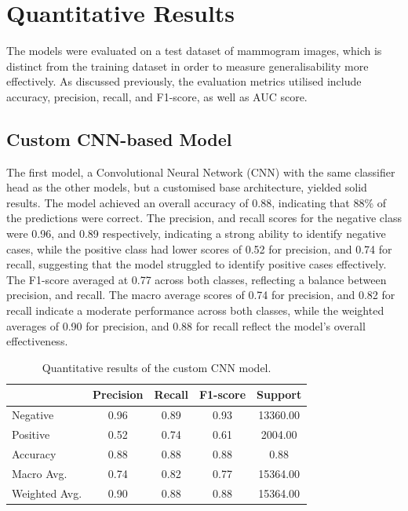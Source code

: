 \documentclass[../main]{subfiles}
\begin{document}
\section{Quantitative Results}
\label{sec:quantitative-results}
The models were evaluated on a test dataset of mammogram images, which is distinct from the training dataset in order to measure generalisability more effectively. As discussed previously, the evaluation metrics utilised include accuracy, precision, recall, and F1-score, as well as AUC score.

\subsection{Custom CNN-based Model}
The first model, a Convolutional Neural Network (CNN) with the same classifier head as the other models, but a customised base architecture, yielded solid results. The model achieved an overall accuracy of 0.88, indicating that 88\% of the predictions were correct. The precision, and recall scores for the negative class were 0.96, and 0.89 respectively, indicating a strong ability to identify negative cases, while the positive class had lower scores of 0.52 for precision, and 0.74 for recall, suggesting that the model struggled to identify positive cases effectively. The F1-score averaged at 0.77 across both classes, reflecting a balance between precision, and recall. The macro average scores of 0.74 for precision, and 0.82 for recall indicate a moderate performance across both classes, while the weighted averages of 0.90 for precision, and 0.88 for recall reflect the model's overall effectiveness.

\begin{table}[h!]
    \centering
    \begin{tabular}{|l|c|c|c|c|}
        \hline
         & Precision & Recall & F1-score & Support \\ \hline
        Negative & 0.96 & 0.89 & 0.93 & 13360.00 \\ \hline
        Positive & 0.52 & 0.74 & 0.61 & 2004.00 \\ \hline
        Accuracy & 0.88 & 0.88 & 0.88 & 0.88 \\ \hline
        Macro Avg. & 0.74 & 0.82 & 0.77 & 15364.00 \\ \hline
        Weighted Avg. & 0.90 & 0.88 & 0.88 & 15364.00 \\ \hline
    \end{tabular}
    \caption{Quantitative results of the custom CNN model.}
    \label{tab:quantitative-results-custom-cnn}
\end{table}
\end{document}
